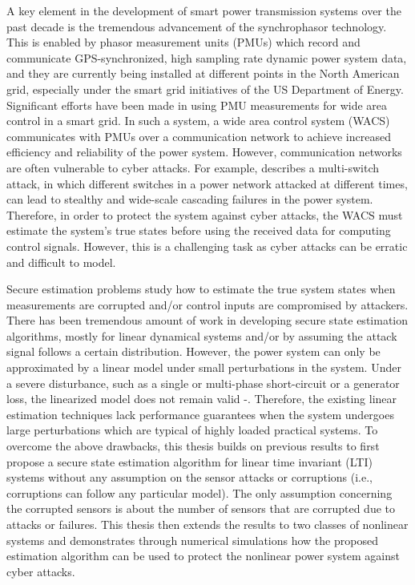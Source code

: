 \documentclass[../thesis.tex]{subfiles}
\begin{document}
A key element in the development of smart power transmission systems over the past decade is the tremendous advancement of the synchrophasor technology. 
This is enabled by phasor measurement units (PMUs) which record and communicate GPS-synchronized, high sampling rate dynamic power system data, and they are currently being installed at different points in the North American grid, especially under the smart grid initiatives of the US Department of Energy.
Significant efforts have been made in using PMU measurements for wide area control in a smart grid. 
In such a system, a wide area control system (WACS) communicates with PMUs over a communication network to achieve increased efficiency and reliability of the power system.
However, communication networks are often vulnerable to cyber attacks. 
For example, \cite{liu2014coordinated} describes a multi-switch attack, in which different switches in a power network attacked at different times, can lead to stealthy and wide-scale cascading failures in the power system.
Therefore, in order to protect the system against cyber attacks, the WACS must estimate the system's true states before using the received data for computing control signals.
However, this is a challenging task as cyber attacks can be erratic and difficult to model. 

Secure estimation problems study how to estimate the true system states when measurements are corrupted and/or control inputs are compromised by attackers.
There has been tremendous amount of work in developing secure state estimation algorithms, mostly for linear dynamical systems and/or by assuming the attack signal follows a certain distribution.
However, the power system can only be approximated by a linear model under small perturbations in the system. 
Under a severe disturbance, such as a single or multi-phase short-circuit or a generator loss, the linearized model does not remain valid \cite{Kundur}-\!\!\cite{nonlin_est}. 
Therefore, the existing linear estimation techniques lack performance guarantees when the system undergoes large perturbations which are typical of highly loaded practical systems. 
To overcome the above drawbacks, this thesis builds on previous results to first propose a secure state estimation algorithm for linear time invariant (LTI) systems without any assumption on the sensor attacks or corruptions (i.e., corruptions can follow any particular model).
The only assumption concerning the corrupted sensors is about the number of sensors that are corrupted due to attacks or failures. 
This thesis then extends the results to two classes of nonlinear systems and demonstrates through numerical simulations how the proposed estimation algorithm can be used to protect the nonlinear power system against cyber attacks.
\end{document}
